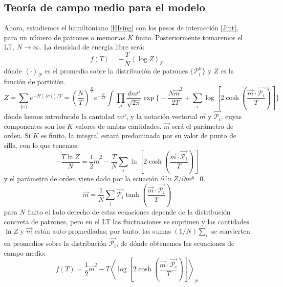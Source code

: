 \documentclass[titlepage,12pt]{article}
\numberwithin{equation}{section}
\begin{document}
	\subsection{Teoría de campo medio para el modelo}
	Ahora, estudiemos el hamiltoniano \eqref{HIsing} con los pesos de interacción \eqref{Jint}, para un número de patrones o memorias $K$ finito. Posteriormente tomaremos el LT, $N\rightarrow\infty$. La densidad de energía libre será:
	\begin{equation}
	f(T)=-\frac{T}{N}\left<\log Z\right>_{\mathcal{P}}
	\label{famit}
	\end{equation}
	dónde $\left<\cdot\right>_\mathcal{P}$ es el promedio sobre la distribución de patrones $\lbrace\mathcal{P}^\mu_i\rbrace$ y $Z$ es la función de partición.
	\begin{equation}
	Z=\sum_{\lbrace\sigma\rbrace}e^{-H(\lbrace\sigma\rbrace)/T}=\left(\frac{N}{T}\right)^{\frac{K}{2}}e^{-\frac{K}{2T}}\int\prod_\mu \frac{dm^\mu}{\sqrt{2\pi}}\exp\Bigg\{-\frac{N\vec{m}^2}{2T}+\sum_i \log\left[2\cosh\left(\frac{\vec{m}\cdot\vec{\mathcal{P}_i}}{T}\right)\right]\Bigg\}
	\label{Zamit}
	\end{equation}
	dónde hemos introducido la cantidad $m^\mu$, y la notación vectorial $\vec{m}$ y $\vec{\mathcal{P}_i}$, cuyas componentes son los $K$ valores de ambas cantidades. $\vec{m}$ será el parámetro de orden. Si $K$ es finito, la integral estará predominada por su valor de punto de silla, con lo que tenemos:
	\begin{equation}
	-\frac{T\ln Z}{N}=\frac{1}{2}\vec{m}^2-\frac{T}{N}\sum_i\ln\left[2\cosh\left(\frac{\vec{m}\cdot\vec{\mathcal{P}_i}}{T}\right)\right]
	\label{saddlepoint}
	\end{equation}
	y el parámetro de orden viene dado por la ecuación $\partial\ln Z/\partial m^\mu$=0.
	\begin{equation}
	\vec{m}=\frac{1}{N}\sum_i \vec{\mathcal{P}_i}\tanh\left(\frac{\vec{m}\cdot\vec{\mathcal{P}_i}}{T}\right)
	\label{eqm}
	\end{equation}
	para $N$ finito el lado derecho de estas ecuaciones depende de la distribución concreta de patrones, pero en el LT las fluctuaciones se suprimen y las cantidades $\ln Z$ y $\vec{m}$ están auto-promediadas; por tanto, las sumas $(1/N)\sum_i$ se convierten en promedios sobre la distribución {$\vec{\mathcal{P}_i}$}, de dónde obtenemos las ecuaciones de campo medio:
	\begin{equation}
	f(T)=\frac{1}{2}\vec{m}^2 - T\left<\log\left[2\cosh\left(\frac{\vec{m}\cdot\vec{\mathcal{P}_i}}{T}\right)\right]\right>_{\mathcal{P}}
	\label{meanfieldf}
	\end{equation}
\end{document}
